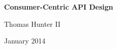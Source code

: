 \thispagestyle{empty}
\begin{center}

\huge{\textbf{Consumer-Centric API Design}}

\null
\vfill

\Large{Thomas Hunter II}

\large{January 2014}

\end{center}

\newpage
\restoregeometry
